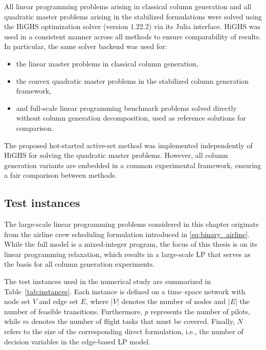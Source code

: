\documentclass{book}
\theoremstyle{definition}
\numberwithin{algorithm_}{chapter}
\begin{document}
{All linear programming problems arising in classical column generation and all quadratic master problems arising in the stabilized formulations were solved using the HiGHS optimization solver (version 1.22.2) via its Julia interface. HiGHS was used in a consistent manner across all methods to ensure comparability of results.
In particular, the same solver backend was used for:
\begin{itemize}
    \item the linear master problems in classical column generation,
    \item the convex quadratic master problems in the stabilized column generation framework,
    \item and full-scale linear programming benchmark problems solved directly without column generation decomposition, used as reference solutions for comparison.
\end{itemize}

The proposed hot-started active-set method was implemented independently of HiGHS for solving the quadratic master problems. However, all column generation variants are embedded in a common experimental framework, ensuring a fair comparison between methods.

\subsection{Test instances}

The large-scale linear programming problems considered in this chapter originate from the airline crew scheduling formulation introduced in \eqref{eq:binary_airline}. While the full model is a mixed-integer program, the focus of this thesis is on its linear programming relaxation, which results in a large-scale LP that serves as the basis for all column generation experiments.

\medskip

The test instances used in the numerical study are summarized in Table~\ref{tab:instances}. Each instance is defined on a time--space network with node set $V$ and edge set $E$, where $|V|$ denotes the number of nodes and $|E|$ the number of feasible transitions. Furthermore, $p$ represents the number of pilots, while $m$ denotes the number of flight tasks that must be covered. Finally, $N$ refers to the size of the corresponding direct formulation, i.e., the number of decision variables in the edge-based LP model.

\begin{table}[ht]
\centering
\renewcommand{\arraystretch}{1.2}


\end{table}}
\end{document}

